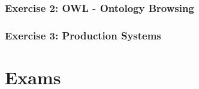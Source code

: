 \documentclass{article}
\begin{document}
        \subsubsection{Exercise 2: OWL - Ontology Browsing}
        \subsubsection{Exercise 3: Production Systems}
    
        
    
    
    
    
    
    
    
    
    
    
    
    
    
    
    

\section{Exams}
    
    
    
    
    
\end{document}
